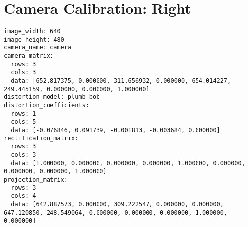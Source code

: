 \section*{Camera Calibration: Right}
\begin{lstlisting}[breaklines=true,basicstyle=\tiny]
image_width: 640
image_height: 480
camera_name: camera
camera_matrix:
  rows: 3
  cols: 3
  data: [652.817375, 0.000000, 311.656932, 0.000000, 654.014227, 249.445159, 0.000000, 0.000000, 1.000000]
distortion_model: plumb_bob
distortion_coefficients:
  rows: 1
  cols: 5
  data: [-0.076846, 0.091739, -0.001813, -0.003684, 0.000000]
rectification_matrix:
  rows: 3
  cols: 3
  data: [1.000000, 0.000000, 0.000000, 0.000000, 1.000000, 0.000000, 0.000000, 0.000000, 1.000000]
projection_matrix:
  rows: 3
  cols: 4
  data: [642.887573, 0.000000, 309.222547, 0.000000, 0.000000, 647.120850, 248.549064, 0.000000, 0.000000, 0.000000, 1.000000, 0.000000]
\end{lstlisting}


